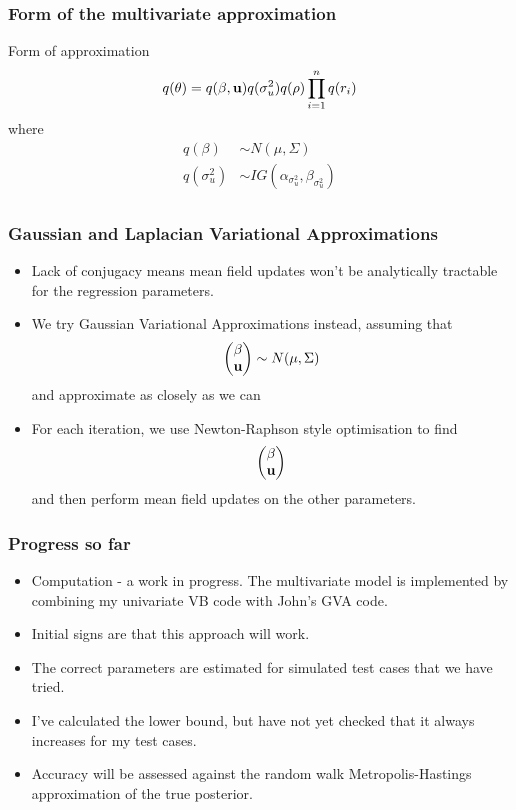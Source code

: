 \documentclass{beamer}
\begin{document}
\begin{frame}
\frametitle{Form of the multivariate approximation}
Form of approximation
$$
q(\theta) = q(\beta, {\bf u}) q(\sigma_u^2) q(\rho) \prod_{i=1}^n q(r_i)
$$
where
\begin{align*}
q(\beta) &\sim N(\mu, \Sigma) \\
q(\sigma_u^2) &\sim IG(\alpha_{\sigma_u^2}, \beta_{\sigma_u^2}) \\
\end{align*}
\end{frame}



\begin{frame}
\frametitle{Gaussian and Laplacian Variational Approximations}
\begin{itemize}
\item Lack of conjugacy means mean field updates won't be analytically tractable for the regression parameters.
\item We try Gaussian Variational Approximations instead, assuming that
$$
\begin{pmatrix}
\beta \\
{\bf u}
\end{pmatrix}
\sim N({\bf \mu}, \Sigma)
$$
and approximate as closely as we can
\item For each iteration, we use Newton-Raphson style optimisation to find
$$
\begin{pmatrix}
\beta \\
{\bf u}
\end{pmatrix}
$$
and then perform mean field updates on the other parameters.
\end{itemize}
\end{frame}

\begin{frame}
\frametitle{Progress so far}
\begin{itemize}
\item Computation - a work in progress. The multivariate model is
implemented by combining my univariate VB code with John's GVA code.
\item Initial signs are that this approach will work.
\item The correct parameters are estimated for simulated test cases
that we have tried.
\item I've calculated the lower bound, but have not yet checked that it
always increases for my test cases.
\item Accuracy will be assessed against the random walk Metropolis-Hastings approximation of the true posterior.
\end{itemize}
\end{frame}
\end{document}
